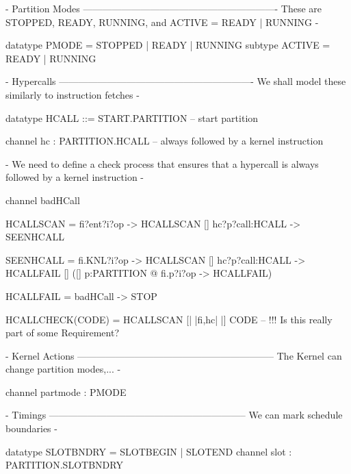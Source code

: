 \begin{circus}
\begin{circus}
\begin{circus}
\begin{circus}
{- Partition Modes -------------------------------------------------------------
  These are STOPPED, READY, RUNNING, and ACTIVE = READY | RUNNING
-}
\begin{circus}

datatype PMODE = STOPPED | READY | RUNNING
subtype ACTIVE = READY | RUNNING
\end{circus}

{- Hypercalls -------------------------------------------------------------
   We shall model these similarly to instruction fetches
-}
\begin{circus}

datatype HCALL ::= START.PARTITION  -- start partition
\end{circus}
\begin{circus}

channel hc : PARTITION.HCALL  -- always followed by a kernel instruction
\end{circus}

{- We need to define a check process that ensures that a hypercall is always
followed by a kernel instruction -}
\begin{circus}

channel badHCall
\end{circus}
\begin{circus}

HCALLSCAN =     fi?ent?i?op     -> HCALLSCAN
             [] hc?p?call:HCALL -> SEENHCALL
\end{circus}
\begin{circus}
SEENHCALL  =    fi.KNL?i?op     -> HCALLSCAN
             [] hc?p?call:HCALL -> HCALLFAIL
             [] ([] p:PARTITION @ fi.p?i?op -> HCALLFAIL)
\end{circus}
\begin{circus}
HCALLFAIL  = badHCall -> STOP
\end{circus}

HCALLCHECK(CODE) = HCALLSCAN [| {|fi,hc|} |] CODE
-- !!! Is this really part of some Requirement?

{- Kernel Actions --------------------------------------------------------------
  The Kernel can change partition modes,...
-}

channel partmode : PMODE

{- Timings  --------------------------------------------------------------
  We can mark schedule boundaries
-}

datatype SLOTBNDRY = SLOTBEGIN | SLOTEND
channel slot : PARTITION.SLOTBNDRY


\end{circus}
\end{circus}
\end{circus}
\end{circus}

